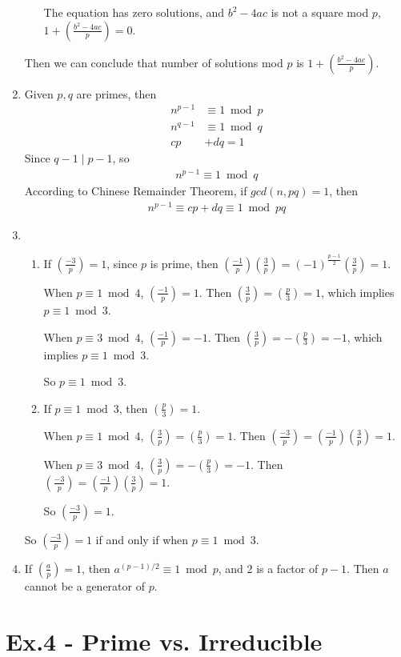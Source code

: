 \documentclass[12pt]{article}
\begin{document}
\begin{enumerate}
\begin{enumerate}
					The equation has zero solutions, and $b^2-4ac$ is not a square mod $p$, $1+(\frac{b^2-4ac}{p})=0$.
			\end{enumerate}
			Then we can conclude that number of solutions mod $p$ is $1+(\frac{b^2-4ac}{p})$.
		\item
			Given $p,q$ are primes, then
			\begin{align*}
				n^{p-1}&\equiv1\bmod p\\
				n^{q-1}&\equiv1\bmod q\\
				cp&+dq=1
			\end{align*}
			Since $q-1\mid p-1$, so
			\begin{align*}
				n^{p-1}\equiv1\bmod q
			\end{align*}
			According to Chinese Remainder Theorem, if $gcd(n,pq)=1$, then
			\begin{align*}
				n^{p-1}\equiv cp+dq\equiv1\bmod pq
			\end{align*}
		\item
			\begin{enumerate}
				\item
					If $(\frac{-3}{p})=1$, since $p$ is prime, then $(\frac{-1}{p})(\frac{3}{p})=(-1)^{\frac{p-1}{2}}(\frac{3}{p})=1$.

					When $p\equiv1\bmod4$, $(\frac{-1}{p})=1$. Then $(\frac{3}{p})=(\frac{p}{3})=1$, which implies $p\equiv1\bmod3$.

					When $p\equiv3\bmod4$, $(\frac{-1}{p})=-1$. Then $(\frac{3}{p})=-(\frac{p}{3})=-1$, which implies $p\equiv1\bmod3$.

					So $p\equiv1\bmod3$.
				\item
					If $p\equiv1\bmod3$, then $(\frac{p}{3})=1$.

					When $p\equiv1\bmod4$, $(\frac{3}{p})=(\frac{p}{3})=1$. Then $(\frac{-3}{p})=(\frac{-1}{p})(\frac{3}{p})=1$.

					When $p\equiv3\bmod4$, $(\frac{3}{p})=-(\frac{p}{3})=-1$. Then $(\frac{-3}{p})=(\frac{-1}{p})(\frac{3}{p})=1$.

					So $(\frac{-3}{p})=1$.
			\end{enumerate}
			So $(\frac{-3}{p})=1$ if and only if when $p\equiv1\bmod3$.
		\item
			If $(\frac{a}{p})=1$, then $a^{(p-1)/2}\equiv1\bmod p$, and 2 is a factor of $p-1$. Then $a$ cannot be a generator of $p$.
	\end{enumerate}

\section*{Ex.4 - Prime vs. Irreducible}
\end{document}
